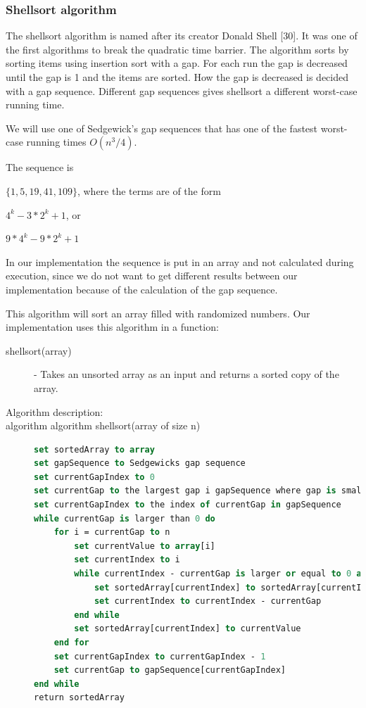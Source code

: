 \documentclass {article}
\begin{document}
\subsubsection{Shellsort algorithm}
The shellsort algorithm is named after its creator Donald Shell [30]. It was one of the first algorithms to break the quadratic time barrier. The algorithm sorts by sorting items using insertion sort with a gap. For each run the gap is decreased until the gap is 1 and the items are sorted. How the gap is decreased is decided with a gap sequence. Different gap sequences gives shellsort a different worst-case running time.
 
We will use one of Sedgewick's gap sequences that has one of the fastest worst-case running times \(O(n^3/4)\). 

The sequence is 

\(\{1, 5, 19, 41, 109\}\), where the terms are of the form

\(4^k - 3 * 2^k + 1\), or

\(9 * 4^k - 9 * 2^k + 1\)
 
In our implementation the sequence is put in an array and not calculated during execution, since we do not want to get different results between our implementation because of the calculation of the gap sequence.

This algorithm will sort an array filled with randomized numbers. Our implementation uses this algorithm in a function:

\begin{description}
\item[shellsort(array)] - Takes an unsorted array as an input and returns a sorted copy of the array.

\item[Algorithm description:]
\item[algorithm algorithm shellsort(array of size n)]
\item []
\begin{lstlisting}[language=Pascal]
set sortedArray to array
set gapSequence to Sedgewicks gap sequence
set currentGapIndex to 0
set currentGap to the largest gap i gapSequence where gap is smaller than n divided by 2
set currentGapIndex to the index of currentGap in gapSequence
while currentGap is larger than 0 do
 	for i = currentGap to n
 		set currentValue to array[i]
 		set currentIndex to i
 		while currentIndex - currentGap is larger or equal to 0 and sortedArray[currentIndex - currentGap] is larger than currentValue do
 			set sortedArray[currentIndex] to sortedArray[currentIndex - currentGap]
 			set currentIndex to currentIndex - currentGap
 		end while
 		set sortedArray[currentIndex] to currentValue
 	end for
 	set currentGapIndex to currentGapIndex - 1
 	set currentGap to gapSequence[currentGapIndex]
end while
return sortedArray
\end{lstlisting}
\end{description}
\end{document}
